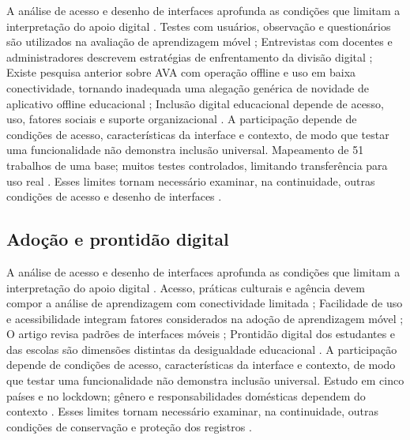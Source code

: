 A análise de acesso e desenho de interfaces aprofunda as condições que limitam a interpretação do apoio digital \citep{kumarmapping2024} \citep{kumiyeboah2023} \citep{linhalis2026} \citep{martin2024}. Testes com usuários, observação e questionários são utilizados na avaliação de aprendizagem móvel \citep{kumarmapping2024}; Entrevistas com docentes e administradores descrevem estratégias de enfrentamento da divisão digital \citep{kumiyeboah2023}; Existe pesquisa anterior sobre AVA com operação offline e uso em baixa conectividade, tornando inadequada uma alegação genérica de novidade de aplicativo offline educacional \citep{linhalis2026}; Inclusão digital educacional depende de acesso, uso, fatores sociais e suporte organizacional \citep{martin2024}. A participação depende de condições de acesso, características da interface e contexto, de modo que testar uma funcionalidade não demonstra inclusão universal. Mapeamento de 51 trabalhos de uma base; muitos testes controlados, limitando transferência para uso real \citep{kumarmapping2024} \citep{kumiyeboah2023} \citep{linhalis2026} \citep{martin2024}. Esses limites tornam necessário examinar, na continuidade, outras condições de acesso e desenho de interfaces \citep{kumarmapping2024} \citep{kumiyeboah2023} \citep{linhalis2026} \citep{martin2024}.

\clearpage\subsection*{Adoção e prontidão digital}

A análise de acesso e desenho de interfaces aprofunda as condições que limitam a interpretação do apoio digital \citep{mathrani2021} \citep{naveed2023} \citep{punchoojit2017} \citep{werfhorst2022}. Acesso, práticas culturais e agência devem compor a análise de aprendizagem com conectividade limitada \citep{mathrani2021}; Facilidade de uso e acessibilidade integram fatores considerados na adoção de aprendizagem móvel \citep{naveed2023}; O artigo revisa padrões de interfaces móveis \citep{punchoojit2017}; Prontidão digital dos estudantes e das escolas são dimensões distintas da desigualdade educacional \citep{werfhorst2022}. A participação depende de condições de acesso, características da interface e contexto, de modo que testar uma funcionalidade não demonstra inclusão universal. Estudo em cinco países e no lockdown; gênero e responsabilidades domésticas dependem do contexto \citep{mathrani2021} \citep{naveed2023} \citep{punchoojit2017} \citep{werfhorst2022}. Esses limites tornam necessário examinar, na continuidade, outras condições de conservação e proteção dos registros \citep{mathrani2021} \citep{naveed2023} \citep{punchoojit2017} \citep{werfhorst2022}.

